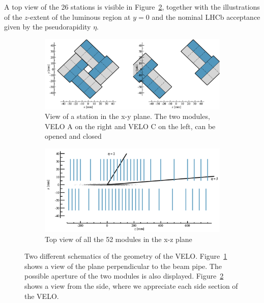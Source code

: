 A top view of the 26 stations is visible in Figure~\ref{fig_velo-side}, together with the illustrations of the $z$-extent of the luminous region at $y=0$ and the nominal LHCb acceptance given by the pseudorapidity $\eta$. 

\begin{figure}
    \centering
    \begin{subfigure}{0.48\textwidth}
    \includegraphics[width=\linewidth]{figures/aperture.png}
    \caption{View of a station in the x-y plane. The two modules, VELO A on the right and VELO C on the left, can be opened and closed}\label{fig_velo-xy}
    \end{subfigure}
    \begin{subfigure}{0.48\textwidth}
    \includegraphics[width=\linewidth]{figures/above_view.png}
    \caption{Top view of all the 52 modules in the x-z plane}\label{fig_velo-side}
    \end{subfigure}
    \caption{Two different schematics of the geometry of the VELO. Figure~\ref{fig_velo-xy} shows a view of the plane perpendicular to the beam pipe. The possible aperture of the two modules is also displayed. Figure~\ref{fig_velo-side} shows a view from the side, where we appreciate each side section of the VELO.}
    \label{fig:velo-geometry}
\end{figure}

